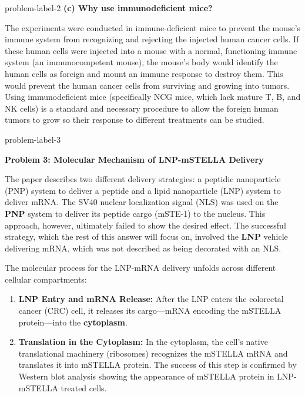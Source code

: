 \begin{multicols}{2}
\begin{problem}{}{problem-label-2}
\textbf{(c)  Why use immunodeficient mice?}

The experiments were conducted in immune-deficient mice to prevent the mouse's immune system from recognizing and rejecting the injected human cancer cells. If these human cells were injected into a mouse with a normal, functioning immune system (an immunocompetent mouse), the mouse's body would identify the human cells as foreign and mount an immune response to destroy them. This would prevent the human cancer cells from surviving and growing into tumors. Using immunodeficient mice (specifically NCG mice, which lack mature T, B, and NK cells) is a standard and necessary procedure to allow the foreign human tumors to grow so their response to different treatments can be studied.


\end{problem}

\vspace{-1.5em}  %
\begin{problem}{}{problem-label-3}


    \noindent\textbf{Problem 3: Molecular Mechanism of LNP-mSTELLA Delivery}

    \vspace{1em} %
    
    The paper describes two different delivery strategies: a peptidic nanoparticle (PNP) system to deliver a peptide and a lipid nanoparticle (LNP) system to deliver mRNA. The SV40 nuclear localization signal (NLS) was used on the \textbf{PNP} system to deliver its peptide cargo (mSTE-1) to the nucleus. This approach, however, ultimately failed to show the desired effect. The successful strategy, which the rest of this answer will focus on, involved the \textbf{LNP} vehicle delivering mRNA, which was not described as being decorated with an NLS.
    
    The molecular process for the LNP-mRNA delivery unfolds across different cellular compartments:
    
    \begin{enumerate}
        \item \textbf{LNP Entry and mRNA Release:} After the LNP enters the colorectal cancer (CRC) cell, it releases its cargo---mRNA encoding the mSTELLA protein---into the \textbf{cytoplasm}.
        
        \item \textbf{Translation in the Cytoplasm:} In the cytoplasm, the cell's native translational machinery (ribosomes) recognizes the mSTELLA mRNA and translates it into mSTELLA protein. The success of this step is confirmed by Western blot analysis showing the appearance of mSTELLA protein in LNP-mSTELLA treated cells.
    

\end{enumerate}
\end{problem}
\end{multicols}
